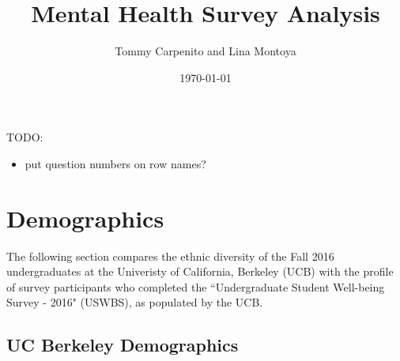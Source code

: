 \documentclass{article}\usepackage[]{graphicx}\usepackage[]{color}
\title{Mental Health Survey Analysis}
\author{Tommy Carpenito and Lina Montoya}
\date{\today}
\begin{document}
\maketitle
\tableofcontents

\pagebreak

TODO:

\begin{itemize}
\item put question numbers on row names?
\end{itemize}

\section{Demographics}
The following section compares the ethnic diversity of the Fall 2016 undergraduates at the Univeristy of California, Berkeley (UCB) with the profile of survey participants who completed the ``Undergraduate Student Well-being Survey - 2016" (USWBS), as populated by the UCB.
\subsection{UC Berkeley Demographics}
\end{document}
